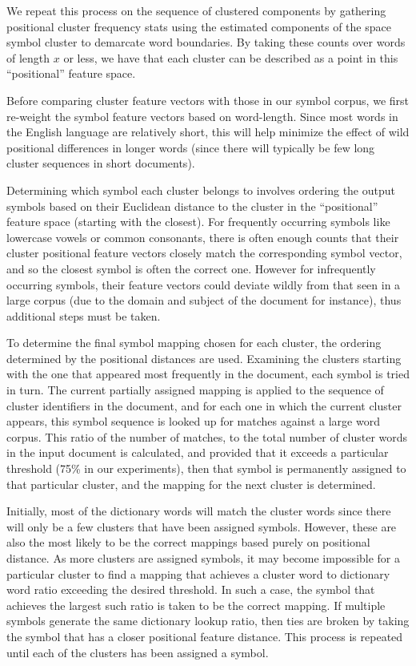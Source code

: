 \documentclass[times, 10pt,twocolumn]{article}
\begin{document}
We repeat this process on the sequence of clustered components by gathering 
positional cluster frequency stats using the estimated components of the space 
symbol cluster to demarcate word boundaries.  By taking these counts over words
of length $x$ or less, we have that each cluster can be described as a point in
this ``positional'' feature space.

Before comparing cluster feature vectors with those in our symbol corpus, we
first re-weight the symbol feature vectors based on word-length.  Since most
words in the English language are relatively short, this will help minimize
the effect of wild positional differences in longer words 
(since there will typically be few long cluster sequences in short documents).

Determining which symbol each cluster belongs to involves ordering the output 
symbols based on their Euclidean distance to the cluster in the ``positional'' 
feature space (starting with the closest).  For frequently
occurring symbols like lowercase vowels or common consonants, there is often
enough counts that their cluster positional feature vectors closely match the 
corresponding symbol vector, and so the closest symbol is often the correct
one.  However for infrequently occurring symbols, their feature vectors could 
deviate wildly from that seen in a large corpus (due to the domain and subject 
of the document for instance), thus additional steps must be taken.

To determine the final symbol mapping chosen for each cluster, the ordering
determined by the positional distances are used.  Examining the clusters 
starting with the one that appeared most frequently in the document, each
symbol is tried in turn.  The current partially assigned mapping is applied to
the sequence of cluster identifiers in the document, and for each one in which
the current cluster appears, this symbol sequence is looked up for matches
against a large word corpus.  This ratio of the number of matches, to the total
number of cluster words in the input document is calculated, and provided that
it exceeds a particular threshold (75\% in our experiments), then that symbol
is permanently assigned to that particular cluster, and the mapping for the
next cluster is determined.

Initially, most of the dictionary words will match the cluster words since there
will only be a few clusters that have been assigned symbols.  However, these 
are also the most likely to be the correct mappings based purely on
positional distance.  As more clusters are assigned symbols, it may become
impossible for a particular cluster to find a mapping that achieves a cluster
word to dictionary word ratio exceeding the desired threshold.  In such a case,
the symbol that achieves the largest such ratio is taken to be the correct
mapping.  If multiple symbols generate the same dictionary lookup ratio, then
ties are broken by taking the symbol that has a closer positional feature
distance.  This process is repeated until each of the clusters has been 
assigned a symbol.
\end{document}
